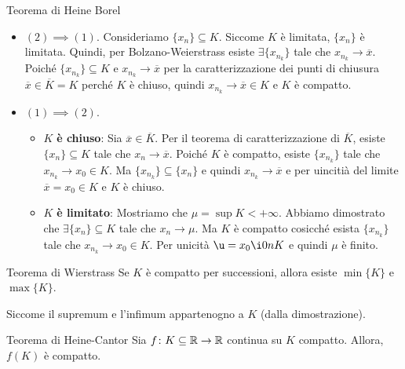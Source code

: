 \documentclass[a4paper]{article}
\begin{document}
\begin{snippetproof}{Teorema di Heine Borel}
    \begin{itemize}
        \item \((2) \implies (1)\).
        Consideriamo \(\{x_n\} \subseteq K\). Siccome \(K\) è limitata,
        \(\{x_n\}\) è limitata. Quindi, per Bolzano-Weierstrass
        esiste \(\exists \{x_{n_k}\}\) tale che \(x_{n_k} \to \overline{x}\).
        Poiché \(\{x_{n_k}\} \subseteq K\) e \(x_{n_k} \to \overline{x}\)
        per la caratterizzazione dei punti di chiusura \(\overline{x} \in \overline{K} = K\)
        perché \(K\) è chiuso, quindi \(x_{n_k} \to \overline{x} \in K\) e \(K\) è compatto.
        \item \((1) \implies (2)\). \begin{itemize}
            \item \(K\) \textbf{è chiuso}: Sia \(\overline{x} \in \overline{K}\).
            Per il teorema di caratterizzazione di  \(\overline{K}\), esiste \(\{x_n\} \subseteq K\)
            tale che \(x_n \to \overline{x}\). Poiché \(K\) è compatto,
            esiste \(\{x_{n_k}\}\) tale che \(x_{n_k} \to x_0 \in K\).
            Ma \(\{x_{n_k}\} \subseteq \{x_n\}\) e quindi \(x_{n_k} \to \overline{x}\)
            e per uincitià del limite \(\overline{x} = x_0 \in K\) e \(K\) è chiuso.
            \item \(K\) \textbf{è limitato}: Mostriamo che \(\mu = \sup K < +\infty\).
            Abbiamo dimostrato che \(\exists \{x_n\} \subseteq K\)
            tale che \(x_n \to \mu\). Ma \(K\) è compatto cosicché esista
            \(\{x_{n_k}\}\) tale che \(x_{n_k} \to x_0 \in K\).
            Per unicità \(\u = x_0 \i0n K\) e quindi \(\mu\) è finito.
        \end{itemize}
    \end{itemize}
\end{snippetproof}

\begin{snippetcorollary}{Teorema di Wierstrass}
    Se \(K\) è compatto per successioni, allora esiste
    \(\min\{K\}\) e \(\max\{K\}\).
\end{snippetcorollary}

Siccome il supremum e l'infimum appartenogno a \(K\) (dalla dimostrazione).

\begin{snippettheorem}{Teorema di Heine-Cantor}
    Sia \(f\colon K \subseteq \mathbb{R} \to \mathbb{R}\) continua
    su \(K\) compatto. Allora, \(f(K)\) è compatto.
\end{snippettheorem}
\end{document}
